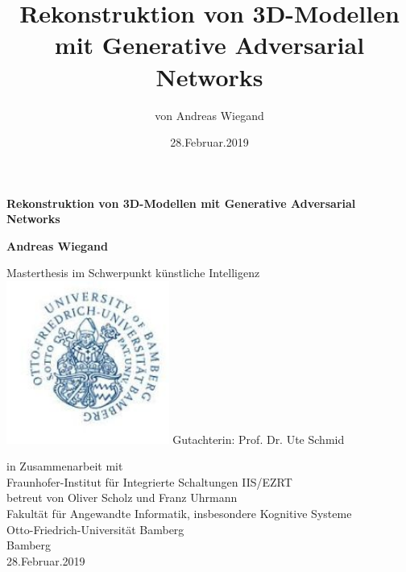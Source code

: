 \documentclass{llncs}
\begin{document}
\begin{titlepage}
	\begin{center}
		\vspace{3cm}
		
		\textbf{\huge Rekonstruktion von 3D-Modellen mit Generative Adversarial Networks}

				
		\vspace{1.5cm}
		
		\textbf{Andreas Wiegand}
		
		
		
		Masterthesis im Schwerpunkt künstliche Intelligenz \\
		\vspace{1.5cm}
		\includegraphics[width=0.4\textwidth]{bamberg_logo.png}
		\vspace{1.5cm}
		Gutachterin: Prof. Dr. Ute Schmid

		\vspace{1.5cm}
		in Zusammenarbeit mit\\
		Fraunhofer-Institut für Integrierte Schaltungen IIS/EZRT\\
		betreut von Oliver Scholz und Franz Uhrmann\\
		\vspace{0.8cm}
		Fakultät für Angewandte Informatik, insbesondere Kognitive Systeme\\
		Otto-Friedrich-Universität Bamberg\\
		Bamberg\\
		28.Februar.2019
		
	\end{center}
\end{titlepage}
\tableofcontents
{}
\title{Rekonstruktion von 3D-Modellen mit Generative Adversarial Networks}
\author{von Andreas Wiegand}
\date{28.Februar.2019}
{\def\addcontentsline#1#2#3{}\maketitle}
\end{document}
